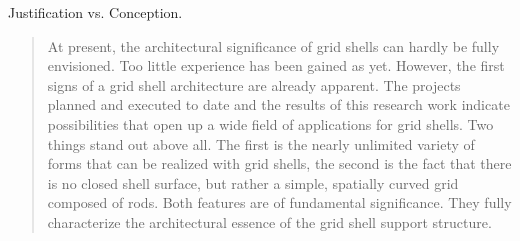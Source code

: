 Justification vs. Conception.

\blockcquote[Blbalb][p.~250]{IL10}{At present, the architectural significance of grid shells can hardly be fully envisioned. Too little experience has been gained as yet. However, the first signs of a grid shell architecture are already apparent. The projects planned and executed to date and the results of this research work indicate possibilities that open up a wide field of applications for grid shells. Two things stand out above all. The first is the nearly unlimited variety of forms that can be realized with grid shells, the second is the fact that there is no closed shell surface, but rather a simple, spatially curved grid composed of rods. Both features are of fundamental significance. They fully characterize the architectural essence of the grid shell support structure.}




